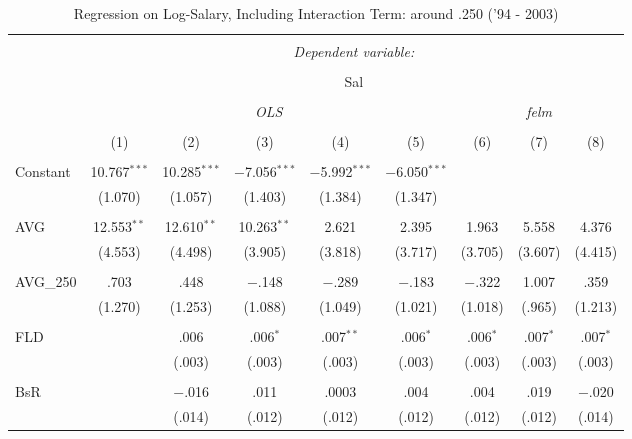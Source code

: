 
\begin{table}[H] \centering
  \caption{Regression on Log-Salary, Including Interaction Term: around .250 ('94 - 2003)} 
  \label{AVG250_C}
\tiny
\begin{tabular}{@{\extracolsep{5pt}}lcccccccc}
\\[-1.8ex]\hline
\hline \\[-1.8ex]
 & \multicolumn{8}{c}{\textit{Dependent variable:}} \\
\cline{2-9}
\\[-1.8ex] & \multicolumn{8}{c}{Sal} \\
\\[-1.8ex] & \multicolumn{5}{c}{\textit{OLS}} & \multicolumn{3}{c}{\textit{felm}} \\
\\[-1.8ex] & (1) & (2) & (3) & (4) & (5) & (6) & (7) & (8)\\
\hline \\[-1.8ex]
 Constant & 10.767$^{***}$ & 10.285$^{***}$ & $-$7.056$^{***}$ & $-$5.992$^{***}$ & $-$6.050$^{***}$ &  &  &  \\
  & (1.070) & (1.057) & (1.403) & (1.384) & (1.347) &  &  &  \\
  & & & & & & & & \\
 AVG & 12.553$^{**}$ & 12.610$^{**}$ & 10.263$^{**}$ & 2.621 & 2.395 & 1.963 & 5.558 & 4.376 \\
  & (4.553) & (4.498) & (3.905) & (3.818) & (3.717) & (3.705) & (3.607) & (4.415) \\
  & & & & & & & & \\
 AVG\_250 & .703 & .448 & $-$.148 & $-$.289 & $-$.183 & $-$.322 & 1.007 & .359 \\
  & (1.270) & (1.253) & (1.088) & (1.049) & (1.021) & (1.018) & (.965) & (1.213) \\
  & & & & & & & & \\
 FLD &  & .006 & .006$^{*}$ & .007$^{**}$ & .006$^{*}$ & .006$^{*}$ & .007$^{*}$ & .007$^{*}$ \\
  &  & (.003) & (.003) & (.003) & (.003) & (.003) & (.003) & (.003) \\
  & & & & & & & & \\
 BsR &  & $-$.016 & .011 & .0003 & .004 & .004 & .019 & $-$.020 \\
  &  & (.014) & (.012) & (.012) & (.012) & (.012) & (.012) & (.014) \\

\end{tabular}
\end{table}
